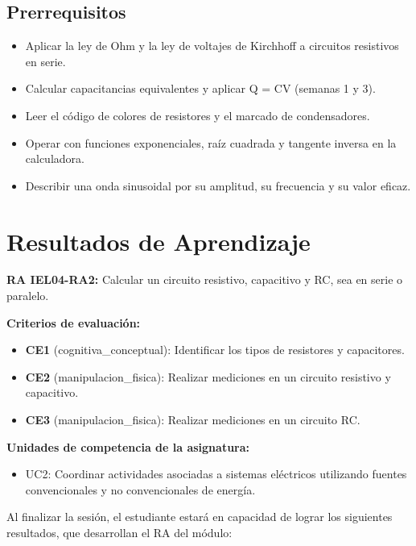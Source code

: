 \documentclass[11pt,letterpaper]{article}
\begin{document}
\subsection{Prerrequisitos}

\begin{itemize}
  \item Aplicar la ley de Ohm y la ley de voltajes de Kirchhoff a circuitos resistivos en serie.
  \item Calcular capacitancias equivalentes y aplicar Q = CV (semanas 1 y 3).
  \item Leer el código de colores de resistores y el marcado de condensadores.
  \item Operar con funciones exponenciales, raíz cuadrada y tangente inversa en la calculadora.
  \item Describir una onda sinusoidal por su amplitud, su frecuencia y su valor eficaz.
\end{itemize}

\section{Resultados de Aprendizaje}

\begin{alineacion}
\textbf{RA IEL04-RA2:} Calcular un circuito resistivo, capacitivo y RC, sea en serie o paralelo.

\textbf{Criterios de evaluación:}

\begin{itemize}
  \item \textbf{CE1} (cognitiva\_conceptual): Identificar los tipos de resistores y capacitores.
  \item \textbf{CE2} (manipulacion\_fisica): Realizar mediciones en un circuito resistivo y capacitivo.
  \item \textbf{CE3} (manipulacion\_fisica): Realizar mediciones en un circuito RC.
\end{itemize}

\textbf{Unidades de competencia de la asignatura:}

\begin{itemize}
  \item UC2: Coordinar actividades asociadas a sistemas eléctricos utilizando fuentes convencionales y no convencionales de energía.
\end{itemize}
\end{alineacion}

Al finalizar la sesión, el estudiante estará en capacidad de lograr los siguientes resultados, que desarrollan el RA del módulo:
\end{document}

